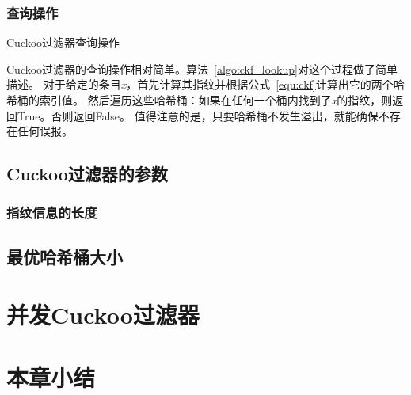 \subsubsection{查询操作}
\begin{algorithm}[htbp]
\SetAlgoLined
{}
\caption{Cuckoo过滤器查询操作}
\label{algo:ckf_lookup}
\end{algorithm}
Cuckoo过滤器的查询操作相对简单。算法~\ref{algo:ckf_lookup}对这个过程做了简单描述。
对于给定的条目\textit{x}，首先计算其指纹并根据公式~\ref{equ:ckf}计算出它的两个哈希桶的索引值。
然后遍历这些哈希桶：如果在任何一个桶内找到了\textit{x}的指纹，则返回True。否则返回False。
值得注意的是，只要哈希桶不发生溢出，就能确保不存在任何误报。

\subsection{Cuckoo过滤器的参数}
\subsubsection{指纹信息的长度}

\subsection{最优哈希桶大小}
\section{并发Cuckoo过滤器}
\subsection{}
\subsection{}
\subsection{}

\section{本章小结}